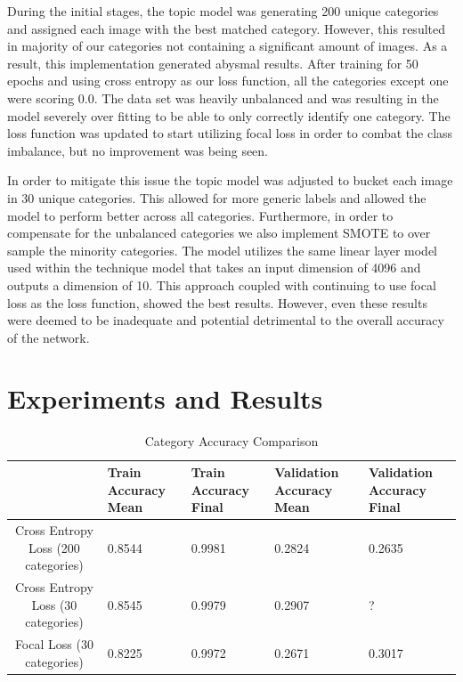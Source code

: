\documentclass[10pt,twocolumn,letterpaper]{article}
\begin{document}
During the initial stages, the topic model was generating 200 unique categories and assigned each image with the best matched category. However, this resulted in majority of our categories not containing a significant amount of images. As a result, this implementation generated abysmal results. After training for 50 epochs and using cross entropy as our loss function, all the categories except one were scoring 0.0. The data set was heavily unbalanced and was resulting in the model severely over fitting to be able to only correctly identify one category. The loss function was updated to start utilizing focal loss in order to combat the class imbalance, but no improvement was being seen. 

In order to mitigate this issue the topic model was adjusted to bucket each image in 30 unique categories. This allowed for more generic labels and allowed the model to perform better across all categories. Furthermore, in order to compensate for the unbalanced categories we also implement SMOTE to over sample the minority categories. The model utilizes the same linear layer model used within the technique model that takes an input dimension of 4096 and outputs a dimension of 10. This approach coupled with continuing to use focal loss as the loss function, showed the best results. However, even these results were deemed to be inadequate and potential detrimental to the overall accuracy of the network. 

\section{Experiments and Results}
\begin{table}
\begin{center}
\begin{tabular}{|c|l|l|l|l|}
\hline
 & Train Accuracy Mean & Train Accuracy Final & Validation Accuracy Mean & Validation Accuracy Final \\
\hline\hline
Cross Entropy Loss (200 categories) & 0.8544 & 0.9981 & 0.2824 & 0.2635 \\
Cross Entropy Loss (30 categories) & 0.8545 & 0.9979 & 0.2907 & ? \\
Focal Loss (30 categories) & 0.8225 & 0.9972 & 0.2671 & 0.3017 \\
\hline
\end{tabular}
\end{center}
\caption{Category Accuracy Comparison}
\label{tab:category_accuracy}
\end{table}
\end{document}
